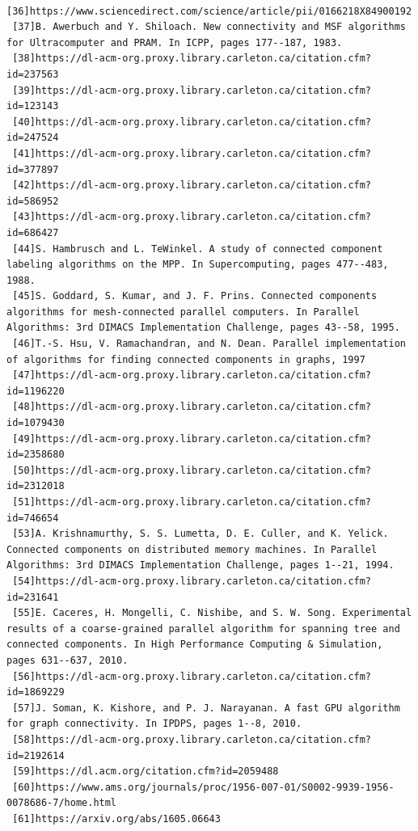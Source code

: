 \documentclass[]{article}
\begin{document}
\begin{verbatim}
 [36]https://www.sciencedirect.com/science/article/pii/0166218X84900192
 [37]B. Awerbuch and Y. Shiloach. New connectivity and MSF algorithms for Ultracomputer and PRAM. In ICPP, pages 177--187, 1983.
 [38]https://dl-acm-org.proxy.library.carleton.ca/citation.cfm?id=237563
 [39]https://dl-acm-org.proxy.library.carleton.ca/citation.cfm?id=123143
 [40]https://dl-acm-org.proxy.library.carleton.ca/citation.cfm?id=247524
 [41]https://dl-acm-org.proxy.library.carleton.ca/citation.cfm?id=377897
 [42]https://dl-acm-org.proxy.library.carleton.ca/citation.cfm?id=586952
 [43]https://dl-acm-org.proxy.library.carleton.ca/citation.cfm?id=686427
 [44]S. Hambrusch and L. TeWinkel. A study of connected component labeling algorithms on the MPP. In Supercomputing, pages 477--483, 1988.
 [45]S. Goddard, S. Kumar, and J. F. Prins. Connected components algorithms for mesh-connected parallel computers. In Parallel Algorithms: 3rd DIMACS Implementation Challenge, pages 43--58, 1995.
 [46]T.-S. Hsu, V. Ramachandran, and N. Dean. Parallel implementation of algorithms for finding connected components in graphs, 1997
 [47]https://dl-acm-org.proxy.library.carleton.ca/citation.cfm?id=1196220
 [48]https://dl-acm-org.proxy.library.carleton.ca/citation.cfm?id=1079430
 [49]https://dl-acm-org.proxy.library.carleton.ca/citation.cfm?id=2358680
 [50]https://dl-acm-org.proxy.library.carleton.ca/citation.cfm?id=2312018
 [51]https://dl-acm-org.proxy.library.carleton.ca/citation.cfm?id=746654
 [53]A. Krishnamurthy, S. S. Lumetta, D. E. Culler, and K. Yelick. Connected components on distributed memory machines. In Parallel Algorithms: 3rd DIMACS Implementation Challenge, pages 1--21, 1994.
 [54]https://dl-acm-org.proxy.library.carleton.ca/citation.cfm?id=231641
 [55]E. Caceres, H. Mongelli, C. Nishibe, and S. W. Song. Experimental results of a coarse-grained parallel algorithm for spanning tree and connected components. In High Performance Computing & Simulation, pages 631--637, 2010.
 [56]https://dl-acm-org.proxy.library.carleton.ca/citation.cfm?id=1869229
 [57]J. Soman, K. Kishore, and P. J. Narayanan. A fast GPU algorithm for graph connectivity. In IPDPS, pages 1--8, 2010.
 [58]https://dl-acm-org.proxy.library.carleton.ca/citation.cfm?id=2192614
 [59]https://dl.acm.org/citation.cfm?id=2059488
 [60]https://www.ams.org/journals/proc/1956-007-01/S0002-9939-1956-0078686-7/home.html
 [61]https://arxiv.org/abs/1605.06643
  \end{verbatim}
\end{document}
